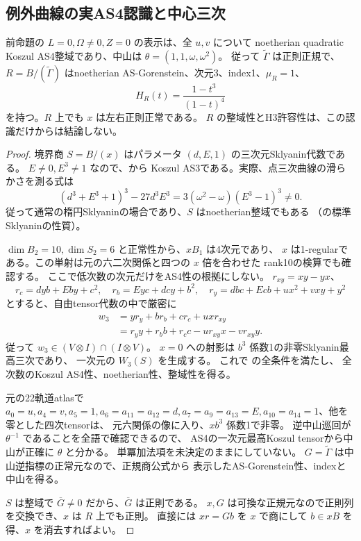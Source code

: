 \subsection{例外曲線の実AS4認識と中心三次}
\label{subsec:cubic-third-root-unit-boundary-L-recognition}
\begin{theorem}[指定 $L$ 開集合の包絡は全て実AS4整域]
\label{thm:cubic-third-root-unit-boundary-L-recognition}
前命題の $L=0,\Omega\ne0,Z=0$ の表示は、全 $u,v$ について
noetherian quadratic Koszul AS4整域であり、中山は
$\theta=(1,1,\omega,\omega^2)$。
従って $\widetilde\Gamma$ は正則正規で、
$R=B/(\widetilde\Gamma)$ はnoetherian AS-Gorenstein、次元3、index1、$\mu_R=1$、
\[
 H_R(t)=\frac{1-t^3}{(1-t)^4}
\]
を持つ。$R$ 上でも $x$ は左右正則正常である。
$R$ の整域性とH3許容性は、この認識だけからは結論しない。
\end{theorem}
\begin{proof}
境界商 $S=B/(x)$ はパラメータ $(d,E,1)$ の三次元Sklyanin代数である。
$E\ne0,E^3\ne1$ なので、\cite[Theorem~1.1, Corollary~6.1]{ISSklyanin}から
Koszul AS3である。実際、点三次曲線の滑らかさを測る式は
\[
 (d^3+E^3+1)^3-27d^3E^3
 =3(\omega^2-\omega)(E^3-1)^3\ne0.
\]
従って通常の楕円Sklyaninの場合であり、$S$ はnoetherian整域でもある
（\cite[Introduction]{SmithTateCenters}の標準Sklyaninの性質）。

$\dim B_2=10,\dim S_2=6$ と正常性から、$xB_1$ は4次元であり、
$x$ は1-regularである。この単射は元の六二次関係と四つの $x$ 倍を合わせた
rank10の検算でも確認する。
ここで低次数の次元だけをAS4性の根拠にしない。
$r_{xy}=xy-yx$、
\[
 r_c=dyb+Eby+c^2,\quad r_b=Eyc+dcy+b^2,\quad
 r_y=dbc+Ecb+ux^2+vxy+y^2
\]
とすると、自由tensor代数の中で厳密に
\begin{align*}
 w_3&=yr_y+br_b+cr_c+u x r_{xy}\\
    &=r_y y+r_b b+r_c c-u r_{xy}x-v r_{xy}y.
\end{align*}
従って $w_3\in(V\otimes I)\cap(I\otimes V)$。
$x=0$ への射影は $b^3$ 係数1の非零Sklyanin最高三次であり、
一次元の $W_3(S)$ を生成する。
これで \cite[Theorem~2.6(5), Corollary~2.7]{LBS}の全条件を満たし、
全次数のKoszul AS4性、noetherian性、整域性を得る。

元の22軌道atlasで
$a_0=u,a_4=v,a_5=1,a_6=a_{11}=a_{12}=d,
 a_7=a_9=a_{13}=E,a_{10}=a_{14}=1$、他を零とした四次tensorは、
元六関係の像に入り、$xb^3$ 係数1で非零。
逆中山巡回が $\theta^{-1}$ であることを全語で確認できるので、
AS4の一次元最高Koszul tensorから中山が正確に $\theta$ と分かる。
単冪加法項を未決定のままにしていない。
$G=\widetilde\Gamma$ は中山逆指標の正常元なので、正規商公式から
表示したAS-Gorenstein性、indexと中山を得る。

$S$ は整域で $\overline G\ne0$ だから、$\overline G$ は正則である。
$x,G$ は可換な正規元なので正則列を交換でき、$x$ は $R$ 上でも正則。
直接には $xr=Gb$ を $x$ で商にして $b\in xB$ を得、$x$ を消去すればよい。
\end{proof}


